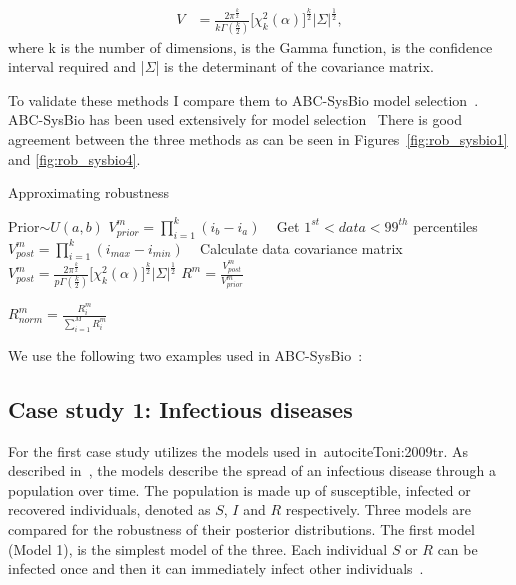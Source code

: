 \begin{align}
	V & = \frac{2\pi^{\frac{k}{2}}}{k\Gamma(\frac{k}{2})} \Big[ \chi _{k}^{2}(\alpha) \Big]^{\frac{k}{2}} |\Sigma|^\frac{1}{2}, \label{eq:el_vol}
\end{align}
\noindent where k is the number of dimensions, \textGamma{} is the Gamma function, \textalpha{} is the confidence interval required and |$\Sigma$| is the determinant of the covariance matrix. %

To validate these methods I compare them to  ABC-SysBio model selection~\autocite{Liepe:2014iw}. ABC-SysBio has been used extensively for model selection~\autocite{Toni:2009tr, Toni:2011jy, Barnes:2011hh} There is good agreement between the three methods as can be seen in Figures~\ref{fig:rob_sysbio1} and \ref{fig:rob_sysbio4}.


\begin{algorithm}[htbp]
\caption{Approximating robustness}
\label{alg:robustness}

 \begin{algorithmic}[1]
    \Statex
		\State Prior$\sim U(a, b)$
    	\State $V_{prior}^{m} = \prod_{i=1}^{k} (i_{b} - i_{a})$ \
		\Statex
			\State Get $1^{st} < data < 99^{th}$ percentiles
    		\State $V_{post}^{m} = \prod_{i=1}^{k} (i_{max} - i_{min})$ \
    		\EndIf
			\If{Ellipsoid calculation}
				\State Calculate data covariance matrix
    			\State $V_{post}^{m} = \frac{2\pi^{\frac{k}{2}}}{p\Gamma(\frac{k}{2})} \Big[ \chi _{k}^{2}(\alpha) \Big]^{\frac{k}{2}} |\Sigma|^\frac{1}{2}$
    		\EndIf
			\Statex
			\State $R^{m} = \frac{V_{post}^{m}}{V_{prior}^{m}}$
			
			\State $R_{norm}^{m} = \frac{R^{m}_i}{\sum_{i=1}^{M} R^m_i }$
		\EndFor
  \end{algorithmic}
\end{algorithm}	
\clearpage
We use the following two examples used in ABC-SysBio~\autocite{Toni:2009tr}:

\subsection{Case study 1: Infectious diseases}
\label{sec:cs1}

For the first case study utilizes the models used in~autocite{Toni:2009tr}. As described in~\textcite{Toni:2009tr}, the models describe the spread of an infectious disease through a population over time. The population is made up of susceptible, infected or recovered individuals, denoted as $S$, $I$ and $R$ respectively. Three models are compared for the robustness of their posterior distributions. The first model (Model 1), is the simplest model of the three. Each individual $S$ or $R$ can be infected once and then it can immediately infect other individuals~\autocite{Toni:2009tr}.

